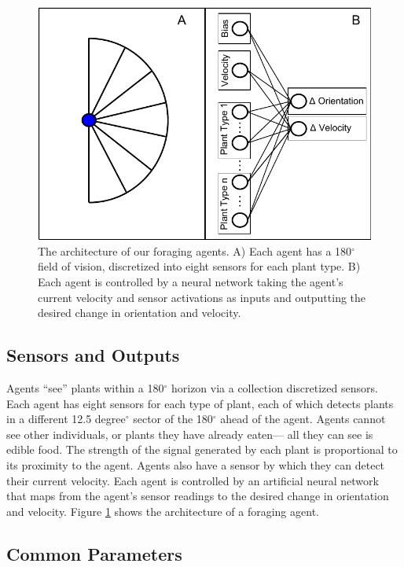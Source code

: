 \documentclass{acm_proc_article-sp}
\begin{document}
\begin{figure}[t]
  \centering
    \includegraphics[scale=.65]{foraging_agent_architecture.pdf}
  \caption{The architecture of our foraging agents. A) Each agent has a 180$^{\circ}$ field of vision, discretized into eight sensors for each plant type. B) Each agent is controlled by a neural network taking the agent's current velocity and sensor activations as inputs and outputting the desired change in orientation and velocity.}
  \label{fig:agent-architecture}
\end{figure}

\subsection*{Sensors and Outputs}

Agents ``see'' plants within a 180$^\circ$ horizon via a collection discretized sensors. Each agent has eight sensors for each type of plant, each of which detects plants in a different 12.5 degree$^\circ$ sector of the 180$^\circ$ ahead of the agent. Agents cannot see other individuals, or plants they have already eaten--- all they can see is edible food. The strength of the signal generated by each plant is proportional to its proximity to the agent. Agents also have a sensor by which they can detect their current velocity. Each agent is controlled by an artificial neural network that maps from the agent's sensor readings to the desired change in orientation and velocity. Figure \ref{fig:agent-architecture} shows the architecture of a foraging agent.

\subsection*{Common Parameters}
\end{document}
